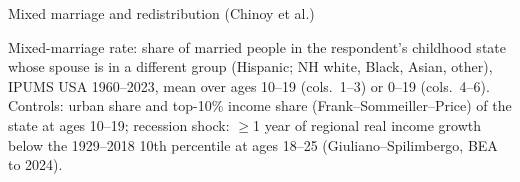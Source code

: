 \documentclass[aspectratio=169]{beamer}
\begin{document}
%
%

\begin{frame}{Mixed marriage and redistribution (Chinoy et al.)}

\begin{table}
    \centering
    \scalebox{0.79}{\parbox{\linewidth}{\centering\tiny\setlength{\tabcolsep}{4pt}\renewcommand{\arraystretch}{0.72}
    }}
\end{table}
\vspace{-0.6em}
{\tiny Mixed-marriage rate: share of married people in the respondent's childhood state whose spouse is in a different group (Hispanic; NH white, Black, Asian, other), IPUMS USA 1960--2023, mean over ages 10--19 (cols.\ 1--3) or 0--19 (cols.\ 4--6). Controls: urban share and top-10\% income share (Frank--Sommeiller--Price) of the state at ages 10--19; recession shock: $\geq$1 year of regional real income growth below the 1929--2018 10th percentile at ages 18--25 (Giuliano--Spilimbergo, BEA to 2024).\par}

\end{frame}
\end{document}
